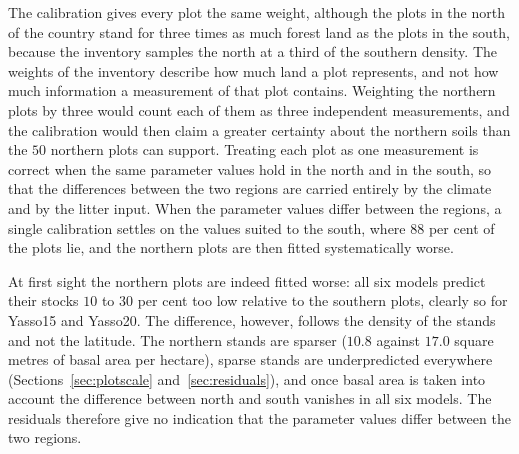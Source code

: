 \documentclass[11pt]{article}
\begin{document}
The calibration gives every plot the same weight, although the plots in the north of the
country stand for three times as much forest land as the plots in the south, because the
inventory samples the north at a third of the southern density. The weights of the
inventory describe how much land a plot represents, and not how much information a
measurement of that plot contains. Weighting the northern plots by three would count each
of them as three independent measurements, and the calibration would then claim a greater
certainty about the northern soils than the $50$ northern plots can support. Treating each
plot as one measurement is correct when the same parameter values hold in the north and in
the south, so that the differences between the two regions are carried entirely by the
climate and by the litter input. When the parameter values differ between the regions, a
single calibration settles on the values suited to the south, where $88$ per cent of the
plots lie, and the northern plots are then fitted systematically worse.

At first sight the northern plots are indeed fitted worse: all six models predict their
stocks $10$ to $30$ per cent too low relative to the southern plots, clearly so for
Yasso15 and Yasso20. The difference, however, follows the density of the stands and not
the latitude. The northern stands are sparser ($10.8$ against $17.0$ square metres of
basal area per hectare), sparse stands are underpredicted everywhere
(Sections~\ref{sec:plotscale} and~\ref{sec:residuals}), and once basal area is taken
into account the difference between north and south vanishes in all six models. The
residuals therefore give no indication that the parameter values differ between the two
regions.
\end{document}
